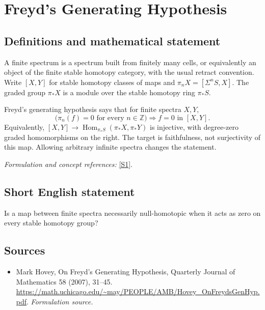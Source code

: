 \documentclass[11pt]{article}
\begin{document}
\section*{\texorpdfstring{Freyd's Generating Hypothesis}{Freyd's Generating Hypothesis}}\label{482}
\subsection{Definitions and mathematical statement}
A finite spectrum is a spectrum built from finitely many cells, or equivalently an object of the finite stable homotopy category, with the usual retract convention. Write $[X,Y]$ for stable homotopy classes of maps and $\pi_nX=[\Sigma^nS,X]$. The graded group $\pi_*X$ is a module over the stable homotopy ring $\pi_*S$.

Freyd's generating hypothesis says that for finite spectra $X,Y$,
\[
 \bigl(\pi_n(f)=0\text{ for every }n\in{\mathbb{Z}}\bigr)
                  \Longrightarrow f=0\text{ in }[X,Y].
\]
Equivalently, $[X,Y]\to\operatorname{Hom}_{\pi_*S}(\pi_*X,\pi_*Y)$ is injective, with degree-zero graded homomorphisms on the right. The target is faithfulness, not surjectivity of this map. Allowing arbitrary infinite spectra changes the statement.
\par\smallskip\textit{Formulation and concept references:} \href{https://math.uchicago.edu/~may/PEOPLE/AMB/Hovey_OnFreydsGenHyp.pdf}{[S1]}.

\subsection{Short English statement}
Is a map between finite spectra necessarily null-homotopic when it acts as zero on every stable homotopy group?
\subsection{Sources}
\begin{itemize}
\item[S1]Mark Hovey, On Freyd's Generating Hypothesis, Quarterly Journal of Mathematics 58 (2007), 31–45.
\url{https://math.uchicago.edu/~may/PEOPLE/AMB/Hovey_OnFreydsGenHyp.pdf}.
\textit{Formulation source.}
\end{itemize}
\end{document}
